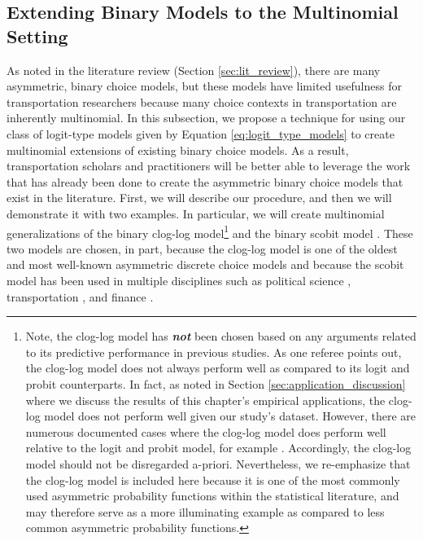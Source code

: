 \subsection{Extending Binary Models to the Multinomial Setting}
\label{sec:binary_to_multinomial}
As noted in the literature review (Section \ref{sec:lit_review}), there are many asymmetric, binary choice models, but these models have limited usefulness for transportation researchers because many choice contexts in transportation are inherently multinomial. In this subsection, we propose a technique for using our class of logit-type models given by Equation \ref{eq:logit_type_models} to create multinomial extensions of existing binary choice models. As a result, transportation scholars and practitioners will be better able to leverage the work that has already been done to create the asymmetric binary choice models that exist in the literature. First, we will describe our procedure, and then we will demonstrate it with two examples. In particular, we will create multinomial generalizations of the binary clog-log model\footnote{Note, the clog-log model has \textit{\textbf{not}} been chosen based on any arguments related to its predictive performance in previous studies. As one referee points out, the clog-log model does not always perform well as compared to its logit and probit counterparts. In fact, as noted in Section \ref{sec:application_discussion} where we discuss the results of this chapter's empirical applications, the clog-log model does not perform well given our study's dataset. However, there are numerous documented cases where the clog-log model does perform well relative to the logit and probit model, for example \citet{spiegelhalter_bayesian_2002, presnell_ios_2004}. Accordingly, the clog-log model should not be disregarded a-priori. Nevertheless, we re-emphasize that the clog-log model is included here because it is one of the most commonly used asymmetric probability functions within the statistical literature, and may therefore serve as a more illuminating example as compared to less common asymmetric probability functions.} \citep{yates_use_1955} and the binary scobit model \citep{nagler_scobit:_1994}. These two models are chosen, in part, because the clog-log model is one of the oldest and most well-known asymmetric discrete choice models \citep{fisher_mathematical_1922, yates_use_1955, mccullagh_generalized_1989} and because the scobit model has been used in multiple disciplines such as political science \citep{nagler_scobit:_1994}, transportation \citep{zhang_scobit-based_2010, zhang_developing_2011, wu_analysis_2012}, and finance \citep{golet_symmetric_2014}. 

